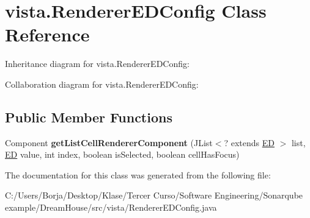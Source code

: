 \hypertarget{classvista_1_1_renderer_e_d_config}{}\section{vista.\+Renderer\+E\+D\+Config Class Reference}
\label{classvista_1_1_renderer_e_d_config}


Inheritance diagram for vista.\+Renderer\+E\+D\+Config\+:


Collaboration diagram for vista.\+Renderer\+E\+D\+Config\+:
\subsection*{Public Member Functions}
\begin{DoxyCompactItemize}
\item 
\mbox{\label{classvista_1_1_renderer_e_d_config_ab2e3d5e37cd5be21f3e147b362970483}} 
Component {\bfseries get\+List\+Cell\+Renderer\+Component} (J\+List$<$? extends \mbox{\hyperlink{classmodelo_1_1_e_d}{ED}} $>$ list, \mbox{\hyperlink{classmodelo_1_1_e_d}{ED}} value, int index, boolean is\+Selected, boolean cell\+Has\+Focus)
\end{DoxyCompactItemize}


The documentation for this class was generated from the following file\+:\begin{DoxyCompactItemize}
\item 
C\+:/\+Users/\+Borja/\+Desktop/\+Klase/\+Tercer Curso/\+Software Engineering/\+Sonarqube example/\+Dream\+House/src/vista/Renderer\+E\+D\+Config.\+java\end{DoxyCompactItemize}
